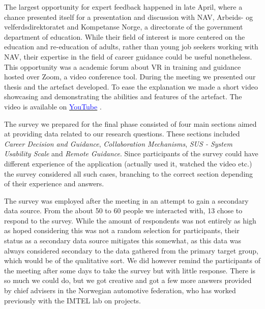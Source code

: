 The largest opportunity for expert feedback happened in late April, where a chance presented itself for a presentation and discussion with NAV, Arbeids- og velferdsdirektoratet and Kompetanse Norge, a directorate of the government department of education. While their field of interest is more centered on the education and re-education of adults, rather than young job seekers working with NAV, their expertise in the field of career guidance could be useful nonetheless.
This opportunity was a academic forum about VR in training and guidance hosted over Zoom, a video conference tool. During the meeting we presented our thesis and the artefact developed. To ease the explanation we made a short video showcasing and demonstrating the abilities and features of the artefact. The video is available on  \href{https://www.youtube.com/watch?v=ZNnK4ohWSag}{\textcolor{blue}{YouTube}} . 

The survey we prepared for the final phase consisted of four main sections aimed at providing data related to our research questions. These sections included \textit{Career Decision and Guidance}, \textit{Collaboration Mechanisms}, \textit{SUS - System Usability Scale} and \textit{Remote Guidance}. Since participants of the survey could have different experience of the application (actually used it, watched the video etc.) the survey considered all such cases, branching to the correct section depending of their experience and answers. 

The survey was employed after the meeting in an attempt to gain a secondary data source. From the about 50 to 60 people we interacted with, 13 chose to respond to the survey. While the amount of respondents was not entirely as high as hoped considering this was not a random selection for participants, their status as a secondary data source mitigates this somewhat, as this data was always considered secondary to the data gathered from the primary target group, which would be of the qualitative sort. We did however remind the participants of the meeting after some days to take the survey but with little response. There is so much we could do, but we got creative and got a few more answers provided by chief advisers in the Norwegian automotive federation, who has worked previously with the IMTEL lab on projects.    








